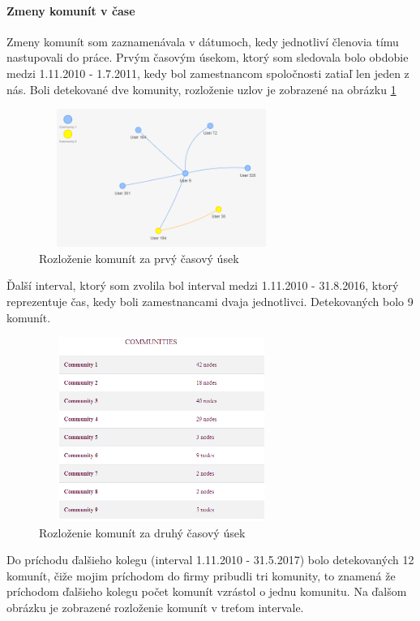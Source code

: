 \documentclass[slovak,master,public,dept460,male,cpdeclaration,oneside]{diploma}
\begin{document}
\paragraph{Zmeny komunít v čase}
\hfill \break

Zmeny komunít som zaznamenávala v dátumoch, kedy jednotliví členovia tímu nastupovali do práce. Prvým časovým úsekom, ktorý som sledovala bolo obdobie medzi 1.11.2010 - 1.7.2011, kedy bol zamestnancom spoločnosti zatiaľ len jeden z nás. Boli detekované dve komunity, rozloženie uzlov je zobrazené na obrázku \ref{team_communities_first}

\begin{figure}[H]
\centering
\includegraphics[width=8cm, height=4.5cm]{figures/team_communities_tab_first}
\caption{Rozloženie komunít za prvý časový úsek}
\label{team_communities_first}
\end{figure}


Ďalší interval, ktorý som zvolila bol interval medzi 1.11.2010 - 31.8.2016, ktorý reprezentuje čas, kedy boli zamestnancami dvaja jednotlivci. Detekovaných bolo 9 komunít. 


\begin{figure}[H]
\centering
\includegraphics[width=8cm, height=6cm]{figures/team_communities_tab_second}
\caption{Rozloženie komunít za druhý časový úsek}
\label{team_communities_second}
\end{figure}

Do príchodu ďalšieho kolegu (interval 1.11.2010 - 31.5.2017) bolo detekovaných 12 komunít, čiže mojim príchodom do firmy pribudli tri komunity, to znamená že príchodom ďalšieho kolegu počet komunít vzrástol o jednu komunitu. Na ďalšom obrázku je zobrazené rozloženie komunít v treťom intervale.
\end{document}
